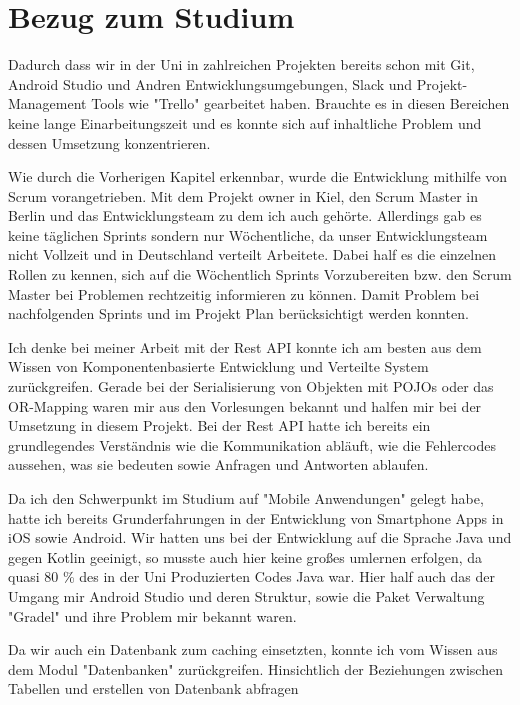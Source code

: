 \chapter{Bezug zum Studium}
Dadurch dass wir in der Uni in zahlreichen Projekten bereits schon mit Git, Android Studio und Andren Entwicklungsumgebungen, Slack und Projekt-Management Tools wie "Trello" gearbeitet haben. Brauchte es in diesen Bereichen keine lange Einarbeitungszeit und es konnte sich auf inhaltliche Problem und dessen Umsetzung konzentrieren.

Wie durch die Vorherigen Kapitel erkennbar, wurde die Entwicklung mithilfe von Scrum vorangetrieben. Mit dem Projekt owner in Kiel, den Scrum Master in Berlin und das Entwicklungsteam zu dem ich auch gehörte. Allerdings gab es keine täglichen Sprints sondern nur Wöchentliche, da unser Entwicklungsteam nicht Vollzeit und in Deutschland verteilt Arbeitete. Dabei half es die einzelnen Rollen zu kennen, sich auf die Wöchentlich Sprints Vorzubereiten bzw. den Scrum Master bei Problemen rechtzeitig informieren zu können. Damit Problem bei nachfolgenden Sprints und im Projekt Plan berücksichtigt werden konnten.  %


Ich denke bei meiner Arbeit mit der Rest API konnte ich am besten aus dem Wissen von Komponentenbasierte Entwicklung und Verteilte System zurückgreifen. Gerade bei der Serialisierung von Objekten mit POJOs oder das OR-Mapping waren mir aus den Vorlesungen bekannt und halfen mir bei der Umsetzung in diesem Projekt. Bei der Rest API hatte ich bereits ein grundlegendes Verständnis wie die Kommunikation abläuft, wie die Fehlercodes aussehen, was sie bedeuten sowie Anfragen und Antworten ablaufen.

Da ich den Schwerpunkt im Studium  auf "Mobile Anwendungen" gelegt habe, hatte ich bereits Grunderfahrungen in der Entwicklung von Smartphone Apps in iOS sowie  Android. Wir hatten uns bei der Entwicklung auf die Sprache Java und gegen Kotlin geeinigt, so musste auch hier keine großes umlernen erfolgen, da quasi 80 \% des in der Uni Produzierten Codes Java war. Hier half auch das der Umgang mir Android Studio und deren Struktur, sowie die Paket Verwaltung "Gradel" und ihre Problem mir bekannt waren.

Da wir auch ein Datenbank zum caching einsetzten, konnte ich vom Wissen aus dem Modul "Datenbanken" zurückgreifen. Hinsichtlich der Beziehungen zwischen Tabellen und erstellen von Datenbank abfragen

